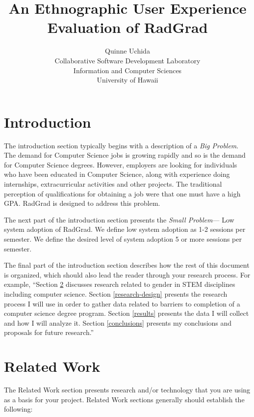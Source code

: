 \documentclass[english]{proposalnsf}
\title{An Ethnographic User Experience Evaluation of RadGrad}
\author{Quinne Uchida \\Collaborative Software Development Laboratory \\ Information and Computer Sciences \\ University of Hawaii}
\begin{document}
\maketitle
\tableofcontents
\newpage

\section{Introduction}
\label{introduction}

The introduction section typically begins with a description of a {\em Big Problem}. The demand for Computer Science jobs is growing rapidly and so is the demand for Computer Science degrees. However, employers are looking for individuals who have been educated in Computer Science, along with experience doing internships, extracurricular activities and other projects. The traditional perception of qualifications for obtaining a job were that one must have a high GPA. RadGrad is designed to address this problem. 

The next part of the introduction section presents the {\em Small Problem}--- Low system adoption of RadGrad. We define low system adoption as 1-2 sessions per semester. We define the desired level of system adoption 5 or more sessions per semester.

The final part of the introduction section describes how the rest of this document is organized, which should also lead the reader through your research process.  For example, ``Section \ref{related-work} discusses research related to gender in STEM disciplines including computer science.  Section \ref{research-design} presents the research process I will use in order to gather data related to barriers to completion of a computer science degree program.  Section \ref{results} presents the data I will collect and how I will analyze it.  Section \ref{conclusions} presents my conclusions and proposals for future research.''

\section{Related Work}
\label{related-work}

The Related Work section presents research and/or technology that you are using as a basis for your project.  Related Work sections generally should establish the following:
\end{document}
